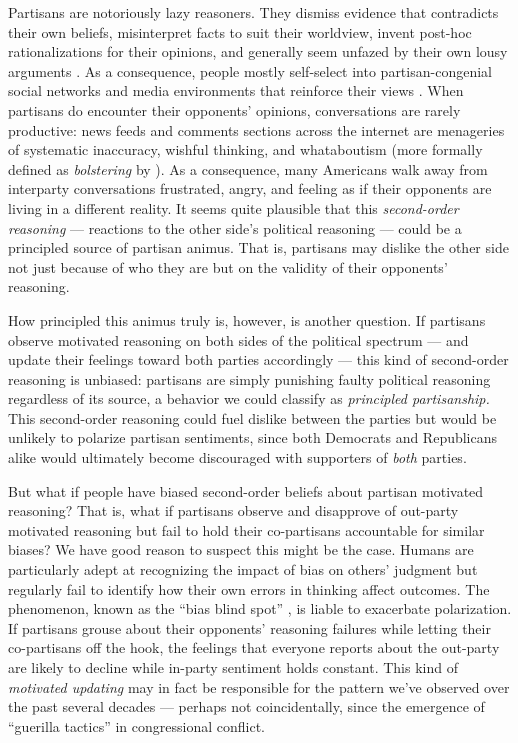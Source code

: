 \documentclass[12pt, letterpaper]{article}
\begin{document}
Partisans are notoriously lazy reasoners. They dismiss evidence that contradicts their own beliefs, misinterpret facts to suit their worldview, invent post-hoc rationalizations for their opinions, and generally seem unfazed by their own lousy arguments \citep{bartels_2002,druckmanetal_2013,gainesetal_2007,taber2006}. As a consequence, people mostly self-select into partisan-congenial social networks and media environments that reinforce their views \citep{stroud_2010}. When partisans do encounter their opponents' opinions, conversations are rarely productive: news feeds and comments sections across the internet are menageries of systematic inaccuracy, wishful thinking, and whataboutism (more formally defined as \emph{bolstering} by \citeauthor{abelson1959modes} \citeyear{abelson1959modes}). As a consequence, many Americans walk away from interparty conversations frustrated, angry, and feeling as if their opponents are living in a different reality. It seems quite plausible that this \emph{second-order reasoning} --- reactions to the other side's political reasoning --- could be a principled source of partisan animus. That is, partisans may dislike the other side not just because of who they are but on the validity of their opponents' reasoning. 

How principled this animus truly is, however, is another question. If partisans observe motivated reasoning on both sides of the political spectrum --- and update their feelings toward both parties accordingly --- this kind of second-order reasoning is unbiased: partisans are simply punishing faulty political reasoning regardless of its source, a behavior we could classify as \textit{principled partisanship.} This second-order reasoning could fuel dislike between the parties but would be unlikely to polarize partisan sentiments, since both Democrats and Republicans alike would ultimately become discouraged with supporters of \emph{both} parties. 

But what if people have biased second-order beliefs about partisan motivated reasoning? That is, what if partisans observe and disapprove of out-party motivated reasoning but fail to hold their co-partisans accountable for similar biases? We have good reason to suspect this might be the case. Humans are particularly adept at recognizing the impact of bias on others' judgment but regularly fail to identify how their own errors in thinking affect outcomes. The phenomenon, known as the ``bias blind spot'' \citep{proninetal_2002,pronin_2007}, is liable to exacerbate polarization. If partisans grouse about their opponents' reasoning failures while letting their co-partisans off the hook, the feelings that everyone reports about the out-party are likely to decline while in-party sentiment holds constant. This kind of \textit{motivated updating} may in fact be responsible for the pattern we've observed over the past several decades \citep{haidthetherington_2012,IyengarSoodLelkes2012} --- perhaps not coincidentally, since the emergence of ``guerilla tactics'' \citep{Schickler2001} in congressional conflict.
\end{document}
